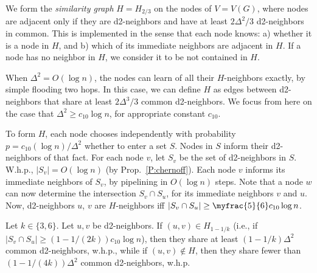 We form the \emph{similarity graph} $H = H_{2/3}$ on the nodes of $V = V(G)$, where nodes are adjacent only if they are d2-neighbors and have at least $2\Delta^2/3$ d2-neighbors in common.
This is implemented in the sense that each node knows:
a) whether it is a node in $H$, and
b) which of its immediate neighbors are adjacent in $H$.
If a node has no neighbor in $H$, we consider it to be not contained in $H$.

When $\Delta^2 = O(\log n)$, the nodes can learn of all their $H$-neighbors exactly, by simple flooding two hops. In this case, we can define $H$ as edges between d2-neighbors that share at least $2\Delta^3/3$ common d2-neighbors. We focus from here on the case that $\Delta^2 \ge c_{10}\log n$, for appropriate constant $c_{10}$.

To form $H$, each node chooses independently with probability $p = c_{10}(\log n)/\Delta^2$ whether to enter a set $S$. Nodes in $S$ inform their d2-neighbors of that fact. For each node $v$, let $S_v$ be the set of d2-neighbors in $S$. W.h.p., $|S_v| = O(\log n)$ (by Prop.~\ref{P:chernoff}). Each node $v$ informs its immediate neighbors of $S_v$, by pipelining in $O(\log n)$ steps.
Note that a node $w$ can now determine the intersection $S_v \cap S_u$, for its immediate neighbors $v$ and $u$.
Now, d2-neighbors $u$, $v$ are $H$-neighbors iff $|S_v \cap S_u| \ge \myfrac{5}{6} c_{10} \log n$. 
\begin{theorem}
Let $k \in \{3,6\}$.
Let $u,v$ be d2-neighbors. 
If $(u,v) \in H_{1-1/k}$ (i.e., if $|S_v \cap S_u| \ge (1-1/(2k)) c_{10} \log n$), then they share at least $(1-1/k) \Delta^2$ common d2-neighbors, w.h.p.,
while if $(u,v) \not\in H$, then they share fewer than $(1-1/(4k)) \Delta^2$ common d2-neighbors, w.h.p.
\label{T:similarity}
\end{theorem}
